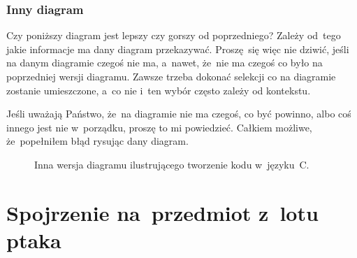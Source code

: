 \documentclass[10pt,t]{beamer}
\begin{document}
\begin{frame}
  \frametitle{Inny diagram}


  Czy poniższy diagram jest lepszy czy gorszy od poprzedniego? Zależy
  od~tego jakie informacje ma dany diagram przekazywać. Proszę~się więc nie
  dziwić, jeśli na danym diagramie czegoś nie ma, a~nawet, że~nie ma czegoś
  co było na poprzedniej wersji diagramu. Zawsze trzeba dokonać selekcji co
  na diagramie zostanie umieszczone, a~co nie i~ten wybór często zależy
  od kontekstu.

  Jeśli uważają Państwo, że~na diagramie nie ma czegoś, co być powinno,
  albo coś innego jest nie w~porządku, \alert{proszę} to mi powiedzieć.
  Całkiem możliwe, że~popełniłem błąd rysując dany diagram.






  \begin{figure}

    \label{fig:Also-creating-code-in-C}


    \caption{Inna wersja diagramu ilustrującego tworzenie kodu w~języku~C.}


  \end{figure}

\end{frame}










\section{Spojrzenie na~przedmiot z~lotu ptaka}
\end{document}
